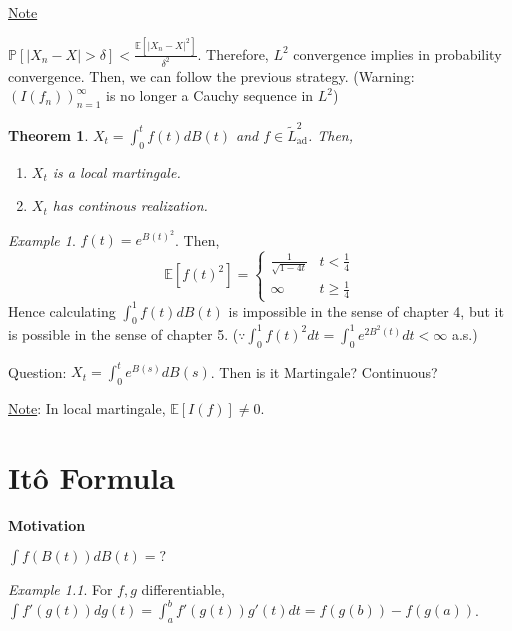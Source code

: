 \documentclass[12pt]{report}
\renewcommand{\P}{\mathbb{P}}
\newcommand{\E}{\mathbb{E}}
\renewcommand{\1}{\mathbb{1}}
\theoremstyle{break}
\newtheorem{thm}{Theorem}[section] %
\theoremstyle{newdef}
\theoremstyle{remark}
\newtheorem*{exmp}{Example} %
\begin{document}
\underline{Note}

$\P[|X_n - X| > \delta] < \frac{\E[|X_n - X|^2]}{\delta^2}$.
Therefore, $L^2$ convergence implies in probability convergence.
Then, we can follow the previous strategy.
(Warning: $(I(f_n))_{n=1}^\infty$ is no longer a Cauchy sequence in $L^2$)

\begin{thm}
$X_t = \int_0^t f(t)dB(t)$ and $f \in \widetilde L^2_{\text{ad}}$.
Then,
\begin{enumerate}
\item $X_t$ is a local martingale.
\item $X_t$ has continous realization.
\end{enumerate}
\end{thm}


\begin{exmp}
$f(t) = e^{B(t)^2}$. Then,
$$
\E[f(t)^2] = 
\begin{cases}
\frac{1}{\sqrt{1-4t}} & t < \frac{1}{4}\\
\infty & t \geq \frac{1}{4}
\end{cases}
$$
Hence calculating $\int_0^1 f(t)dB(t)$ is impossible in the sense of chapter 4,
but it is possible in the sense of chapter 5.
($\because \int_0^1 f(t)^2 dt = \int_0^1 e^{2B^2(t)} dt < \infty$ a.s.)
\end{exmp}

Question: $X_t = \int_0^t e^{B(s)}dB(s)$. Then is it Martingale? Continuous?


\underline{Note}: In local martingale, $\E[I(f)] \neq 0$.





\setcounter{chapter}{6}
\chapter{It\^o Formula}


\textbf{Motivation}

$\int f(B(t)) dB(t) = ?$


\begin{exmp}
For $f, g$ differentiable,
$\int f'(g(t)) dg(t) = \int_a^b f'(g(t))g'(t)dt = f(g(b)) - f(g(a))$.
\end{exmp}
\end{document}
